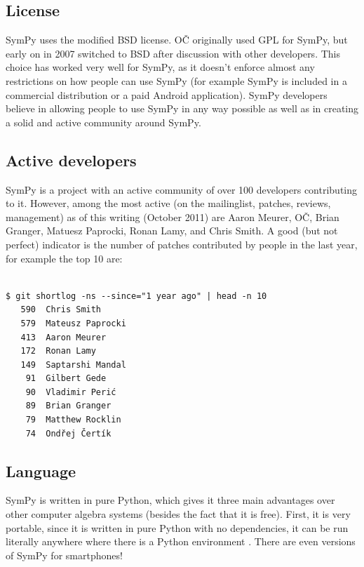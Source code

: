 \documentclass[12pt]{article}
\def\OC{OČ}
\def\AM{Aaron Meurer}
\begin{document}
\subsection{License}

SymPy uses the modified BSD license. \OC{} originally used GPL for SymPy, but
early on in 2007 switched to BSD after discussion with other developers. This
choice has worked very well for SymPy, as it doesn't enforce almost any
restrictions on how people can use SymPy (for example SymPy is included in
a commercial distribution or a paid Android application). SymPy developers
believe in allowing people to use SymPy in any way possible as well as in
creating a solid and active community around SymPy.

\subsection{Active developers}

SymPy is a project with an active community of
over 100 developers contributing to it. However, among the most active (on the
mailinglist, patches, reviews, management) as of this writing (October 2011)
are \AM, \OC, Brian Granger, Matuesz Paprocki, Ronan Lamy, and Chris
Smith. A good (but not perfect) indicator is the number of patches contributed by
people in the last year, for example the top 10 are:

\begin{Verbatim}[fontsize=\scriptsize,fontfamily=courier,fontshape=tt,frame=single,label=git-log]

$ git shortlog -ns --since="1 year ago" | head -n 10
   590  Chris Smith
   579  Mateusz Paprocki
   413  Aaron Meurer
   172  Ronan Lamy
   149  Saptarshi Mandal
    91  Gilbert Gede
    90  Vladimir Perić
    89  Brian Granger
    79  Matthew Rocklin
    74  Ondřej Čertík
\end{Verbatim}


\subsection{Language}

SymPy is written in pure Python, which gives it three main advantages
over other computer algebra systems (besides the fact that it is free).
First, it is very portable, since it is written in pure Python with no
dependencies, it can be run literally anywhere where there is a Python
environment . There are even versions of SymPy for smartphones!
\end{document}

